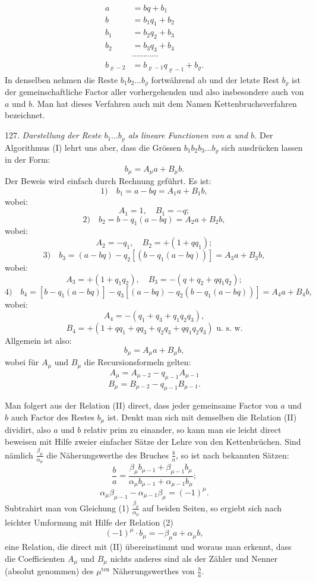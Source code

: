 \documentclass[11pt]{article}
\providecommand{\weberpage}[1]{}
\providecommand{\weq}[2]{\begin{equation}\tag{#1}#2\end{equation}}
\begin{document}
\weberpage{132}
\weq{I}{
\begin{aligned}
a &= bq + b_1 \\
b &= b_1 q_1 + b_2 \\
b_1 &= b_2 q_2 + b_3 \\
b_2 &= b_3 q_3 + b_4 \\
& \cdots\cdots\cdots\cdots \\
b_{\varrho-2} &= b_{\varrho-1} q_{\varrho-1} + b_\varrho.
\end{aligned}
}
In denselben nehmen die Reste $b_1 b_2 \ldots b_\varrho$ fortwährend ab und der letzte Rest $b_\varrho$ ist der gemeinschaftliche Factor aller vorhergehenden und also insbesondere auch von $a$ und $b$. Man hat dieses Verfahren auch mit dem Namen Kettenbruchsverfahren bezeichnet.

127. \textit{Darstellung der Reste $b_1 \ldots b_\varrho$ als lineare Functionen von $a$ und $b$.} Der Algorithmus (I) lehrt uns aber, dass die Grössen $b_1 b_2 b_3 \ldots b_\varrho$ sich ausdrücken lassen in der Form:
\weq{II}{ b_\mu = A_\mu a + B_\mu b. }
Der Beweis wird einfach durch Rechnung geführt. Es ist:
\[ 1)\quad b_1 = a - bq = A_1 a + B_1 b, \]
wobei:
\[ A_1 = 1, \quad B_1 = -q; \]
\[ 2)\quad b_2 = b - q_1(a - bq) = A_2 a + B_2 b, \]
wobei:
\[ A_2 = -q_1, \quad B_2 = +(1 + qq_1); \]
\[ 3)\quad b_3 = (a - bq) - q_2[(b - q_1(a - bq))] = A_3 a + B_3 b, \]
wobei:
\[ A_3 = +(1 + q_1q_2), \quad B_3 = -(q + q_2 + qq_1q_2); \]
\[ 4)\quad b_4 = [b - q_1(a - bq)] - q_3[(a - bq) - q_2(b - q_1(a - bq))] = A_4 a + B_4 b, \]
wobei:
\[ A_4 = -(q_1 + q_3 + q_1q_2q_3), \]
\[ B_4 = +(1 + qq_1 + qq_3 + q_2q_3 + qq_1q_2q_3) \text{ u. s. w.} \]
Allgemein ist also:
\[ b_\mu = A_\mu a + B_\mu b, \]
wobei für $A_\mu$ und $B_\mu$ die Recursionsformeln gelten:
\[ A_\mu = A_{\mu-2} - q_{\mu-1} A_{\mu-1} \]
\[ B_\mu = B_{\mu-2} - q_{\mu-1} B_{\mu-1}. \]


\weberpage{133}
Man folgert aus der Relation (II) direct, dass jeder gemeinsame Factor von $a$ und $b$ auch Factor des Restes $b_\mu$ ist. Denkt man sich mit demselben die Relation (II) dividirt, also $a$ und $b$ relativ prim zu einander, so kann man sie leicht direct beweisen mit Hilfe zweier einfacher Sätze der Lehre von den Kettenbrüchen. Sind nämlich $\frac{\beta_\mu}{\alpha_\mu}$ die Näherungswerthe des Bruches $\frac{b}{a}$, so ist nach bekannten Sätzen:
\weq{1}{ \frac{b}{a} = \frac{\beta_\mu b_{\mu-1} + \beta_{\mu-1} b_\mu}{\alpha_\mu b_{\mu-1} + \alpha_{\mu-1} b_\mu}; }
\weq{2}{ \alpha_\mu \beta_{\mu-1} - \alpha_{\mu-1} \beta_\mu = (-1)^\mu. }
Subtrahirt man von Gleichung (1) $\frac{\beta_\mu}{\alpha_\mu}$ auf beiden Seiten, so ergiebt sich nach leichter Umformung mit Hilfe der Relation (2)
\weq{III}{ (-1)^\mu \cdot b_\mu = -\beta_\mu a + \alpha_\mu b, }
eine Relation, die direct mit (II) übereinstimmt und woraus man erkennt, dass die Coefficienten $A_\mu$ und $B_\mu$ nichts anderes sind als der Zähler und Nenner (absolut genommen) des $\mu^{\mathrm{ten}}$ Näherungswerthes von $\frac{b}{a}$.
\end{document}
